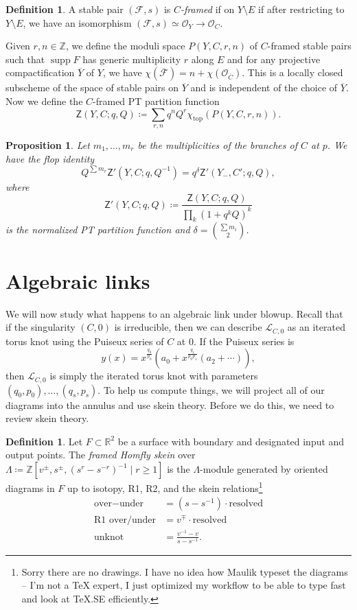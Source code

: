 \documentclass[leqno, openany]{memoir}
\newtheorem{prop}[thm]{Proposition}
\theoremstyle{definition}
\newtheorem{defn}[thm]{Definition}
\theoremstyle{remark}
\theoremstyle{plain}
\theoremstyle{definition}
\theoremstyle{remark}
\newcommand{\R}{\mathbb{R}}
\newcommand{\Z}{\mathbb{Z}}
\newcommand{\mc}[1]{\mathcal{#1}}
\newcommand{\mr}[1]{\mathrm{#1}}
\newcommand{\ms}[1]{\mathsf{#1}}
\newcommand{\ol}[1]{\overline{#1}}
\newcommand{\1}{\mathbf{1}}
\newcommand{\2}{\mathbf{2}}
\newcommand{\3}{\mathbf{3}}
\DeclareMathOperator{\supp}{supp}
\begin{document}
\begin{defn}
    A stable pair $(\mc{F}, s)$ is \textit{$C$-framed} if on $Y \setminus E$ if after restricting to $Y \setminus E$, we have an isomorphism $(\mc{F}, s) \simeq \mc{O}_Y \to \mc{O}_C$.
\end{defn}

Given $r, n \in \Z$, we define the moduli space $P(Y, C, r, n)$ of $C$-framed stable pairs such that $\supp F$ has generic multiplicity $r$ along $E$ and for any projective compactification $\ol{Y}$ of $Y$, we have $\chi(\ol{\mc{F}}) = n + \chi(\mc{O}_{\ol{C}})$. This is a locally closed subscheme of the space of stable pairs on $\ol{Y}$ and is independent of the choice of $\ol{Y}$. Now we define the $C$-framed PT partition function
\[ \ms{Z}(Y, C; q, Q) \coloneqq \sum_{r,n} q^n Q^r \chi_{\mr{top}}(P(Y,C,r,n)). \]

\begin{prop}
    Let $m_1, \ldots, m_r$ be the multiplicities of the branches of $C$ at $p$. We have the flop identity
    \[Q^{\sum m_r} \ms{Z}'(Y, C; q, Q^{-1}) = q^{\delta} \ms{Z}'(Y_-, C'; q,Q), \]
    where 
    \[ \ms{Z}'(Y,C; q,Q) \coloneqq \frac{\ms{Z}(Y,C; q,Q)}{\prod_k {(1+q^k Q)}^k} \]
    is the normalized PT partition function and $\delta = \binom{\sum m_i}{2}$.
\end{prop}

\section{Algebraic links}%
\label{sec:algebraic_links}

We will now study what happens to an algebraic link under blowup. Recall that if the singularity $(C, 0)$ is irreducible, then we can describe $\mc{L}_{C,0}$ as an iterated torus knot using the Puiseux series of $C$ at $0$. If the Puiseux series is
\[ y(x) = x^{\frac{q_0}{p_0}} (a_0 + x^{\frac{q_1}{p_0 p_1}} (a_2 + \cdots)), \]
then $\mc{L}_{C,0}$ is simply the iterated torus knot with parameters $(q_0, p_0), \ldots, (q_s, p_s)$. To help us compute things, we will project all of our diagrams into the annulus and use skein theory. Before we do this, we need to review skein theory.

\begin{defn}
    Let $F \subset \R^2$ be a surface with boundary and designated input and output points. The \textit{framed Homfly skein} over $\Lambda \coloneqq \Z[v^{\pm}, s^{\pm}, {(s^r - s^{-r})}^{-1} \mid r \geq 1]$ is the $\Lambda$-module generated by oriented diagrams in $F$ up to isotopy, R1, R2, and the skein relations\footnote{Sorry there are no drawings. I have no idea how Maulik typeset the diagrams -- I'm not a TeX expert, I just optimized my workflow to be able to type fast and look at TeX.SE efficiently.}
    \begin{align}
        \text{over} - \text{under} &= (s-s^{-1}) \cdot \text{resolved} \\
        \text{R1 over/under} &= v^{\mp} \cdot \text{resolved} \\
        \text{unknot} &= \frac{v^{-1} - v}{s-s^{-1}}.
    \end{align}
\end{defn}
\end{document}
